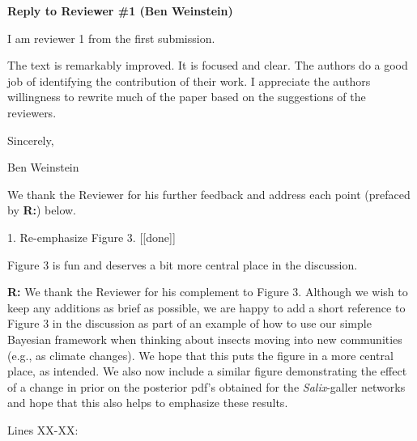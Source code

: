 \documentclass[12pt]{letter}
\newenvironment{refquote}{\bigskip \begin{it}}{\end{it}\smallskip}
\begin{document}
\newpage


{\Large \bf Reply to Reviewer \#1 (Ben Weinstein)}

	\begin{refquote}

		I am reviewer 1 from the first submission. 

		The text is remarkably improved. It is focused and clear. The authors do a good job of identifying the contribution of their work. I appreciate the authors willingness to rewrite much of the paper based on the suggestions of the reviewers. 


		Sincerely, 

		Ben Weinstein

	\end{refquote}


	We thank the Reviewer for his further feedback and address each point (prefaced by \textbf{R:}) below.

	1. Re-emphasize Figure 3. [[done]]

		\begin{refquote}

			Figure 3 is fun and deserves a bit more central place in the discussion. 

		\end{refquote}


		\textbf{R:} We thank the Reviewer for his complement to Figure 3. Although we wish to keep any additions as brief as possible, we are happy to add a short reference to Figure 3 in the discussion as part of an example of how to use our simple Bayesian framework when thinking about insects moving into new communities (e.g., as climate changes). We hope that this puts the figure in a more central place, as intended. We also now include a similar figure demonstrating the effect of a change in prior on the posterior pdf's obtained for the \emph{Salix}-galler networks and hope that this also helps to emphasize these results.


		Lines XX-XX:
\end{document}
